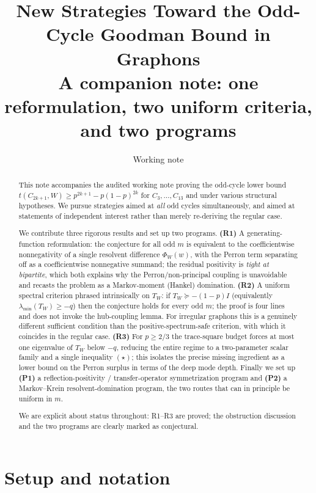 \documentclass[11pt]{article}
\title{New Strategies Toward the Odd-Cycle Goodman Bound in Graphons\\
\large A companion note: one reformulation, two uniform criteria, and two programs}
\author{Working note}
\date{}
\theoremstyle{definition}
\newcommand{\1}{\mathbf{1}}
\begin{document}
\maketitle

\begin{abstract}
This note accompanies the audited working note proving the odd-cycle lower bound
$t(C_{2k+1},W)\ge p^{2k+1}-p(1-p)^{2k}$ for $C_3,\dots,C_{13}$ and under various
structural hypotheses. We pursue strategies aimed at \emph{all} odd cycles
simultaneously, and aimed at statements of independent interest rather than
merely re-deriving the regular case.

We contribute three rigorous results and set up two programs.
\textbf{(R1)} A generating-function reformulation: the conjecture for all odd $m$
is equivalent to the coefficientwise nonnegativity of a single resolvent
difference $\Phi_W(w)$, with the Perron term separating off as a coefficientwise
nonnegative summand; the residual positivity is \emph{tight at bipartite},
which both explains why the Perron/non-principal coupling is unavoidable and
recasts the problem as a Markov-moment (Hankel) domination.
\textbf{(R2)} A uniform spectral criterion phrased intrinsically on $T_W$:
if $T_W\succeq-(1-p)I$ (equivalently $\lambda_{\min}(T_W)\ge-q$) then the
conjecture holds for every odd $m$; the proof is four lines and does not invoke
the hub-coupling lemma. For irregular graphons this is a genuinely different
sufficient condition than the positive-spectrum-safe criterion, with which it
coincides in the regular case.
\textbf{(R3)} For $p\ge 2/3$ the trace-square budget forces at most one
eigenvalue of $T_W$ below $-q$, reducing the entire regime to a two-parameter
scalar family and a single inequality $(\star)$; this isolates the precise
missing ingredient as a lower bound on the Perron surplus in terms of the deep
mode depth.
Finally we set up \textbf{(P1)} a reflection-positivity / transfer-operator
symmetrization program and \textbf{(P2)} a Markov--Krein resolvent-domination
program, the two routes that can in principle be uniform in $m$.

We are explicit about status throughout: R1--R3 are proved; the obstruction
discussion and the two programs are clearly marked as conjectural.
\end{abstract}

\section{Setup and notation}\label{sec:setup}
\end{document}
